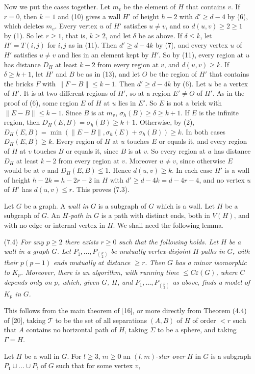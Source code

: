 {Now we put the cases together. Let $m_v$ be the element of $H$ that contains $v$. If $r = 0$, then $k = 1$ and (10) gives a wall $H'$ of height $h - 2$ with $d' \ge d - 4$ by (6), which deletes $m_v$. Every vertex $u$ of $H'$ satisfies $u \ne v$, and so $d(u, v) \ge 2 \ge 1$ by (1). So let $r \ge 1$, that is, $k \ge 2$, and let $\delta$ be as above. If $\delta \le k$, let $H' = T(i, j)$ for $i, j$ as in (11). Then $d' \ge d - 4k$ by (7), and every vertex $u$ of $H'$ satisfies $u \ne v$ and lies in an element kept by $H'$. So by (11), every region at $u$ has distance $D_H$ at least $k - 2$ from every region at $v$, and $d(u, v) \ge k$. If $\delta \ge k + 1$, let $H'$ and $B$ be as in (13), and let $O$ be the region of $H'$ that contains the bricks $F$ with $\|F - B\| \le k - 1$. Then $d' \ge d - 4k$ by (6). Let $u$ be a vertex of $H'$. It is at two different regions of $H'$, so at a region $E' \ne O$ of $H'$. As in the proof of (6), some region $E$ of $H$ at $u$ lies in $E'$. So $E$ is not a brick with $\|E - B\| \le k - 1$. Since $B$ is at $m_v$, $\sigma_h(B) \ge \delta \ge k + 1$. If $E$ is the infinite region, then $D_H(E, B) = \sigma_h(B) \ge k + 1$. Otherwise, by (2), $D_H(E, B) = \min(\|E - B\|, \sigma_h(E) + \sigma_h(B)) \ge k$. In both cases $D_H(E, B) \ge k$. Every region of $H$ at $u$ touches $E$ or equals it, and every region of $H$ at $v$ touches $B$ or equals it, since $B$ is at $v$. So every region at $u$ has distance $D_H$ at least $k - 2$ from every region at $v$. Moreover $u \ne v$, since otherwise $E$ would be at $v$ and $D_H(E, B) \le 1$. Hence $d(u, v) \ge k$. In each case $H'$ is a wall of height $h - 2k = h - 2r - 2$ in $H$ with $d' \ge d - 4k = d - 4r - 4$, and no vertex $u$ of $H'$ has $d(u, v) \le r$. This proves (7.3).}

Let $G$ be a graph. A \textit{wall in} $G$ is a subgraph of $G$ which is a wall. Let $H$ be a subgraph of $G$. An \textit{$H$-path in} $G$ is a path with distinct ends, both in $V(H)$, and with no edge or internal vertex in $H$. We shall need the following lemma.

\stmt
(7.4) \textit{For any $p \ge 2$ there exists $r \ge 0$ such that the following holds. Let $H$ be a wall in a graph $G$. Let $P_1, \dots, P_{\binom{p}{2}}$ be mutually vertex-disjoint $H$-paths in $G$, with their $p(p - 1)$ ends mutually at distance $\ge r$. Then $G$ has a minor isomorphic to $K_p$. Moreover, there is an algorithm, with running time $\le C\varepsilon(G)$, where $C$ depends only on $p$, which, given $G$, $H$, and $P_1, \dots, P_{\binom{p}{2}}$ as above, finds a model of $K_p$ in $G$.}

This follows from the main theorem of [16], or more directly from Theorem (4.4) of [20], taking $\mathcal{T}$ to be the set of all separations $(A, B)$ of $H$ of order $< r$ such that $A$ contains no horizontal path of $H$, taking $\Sigma$ to be a sphere, and taking $\Gamma = H$.

Let $H$ be a wall in $G$. For $l \ge 3$, $m \ge 0$ an $(l, m)$-\textit{star over} $H$ in $G$ is a subgraph $P_1 \cup \dots \cup P_l$ of $G$ such that for some vertex $v$,
